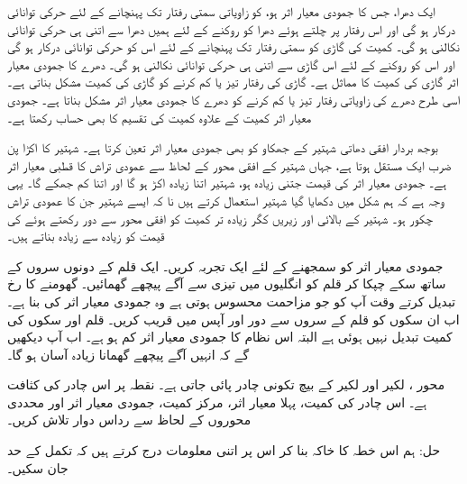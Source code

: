 ایک دھرا،  جس کا جمودی معیار اثر  ہو،  کو  زاویاتی سمتی رفتار  تک پہنچانے  کے لئے  حرکی  توانائی درکار ہو گی اور اس رفتار پر چلتے ہوئے دھرا کو روکنے کے لئے  ہمیں دھرا سے اتنی ہی  حرکی توانائی   نکالنی ہو گی۔ کمیت  کی گاڑی کو سمتی رفتار  تک پہنچانے کے لئے اس کو   حرکی توانائی درکار ہو گی اور اس کو روکنے کے لئے  اس  گاڑی سے اتنی ہی حرکی  توانائی نکالنی ہو گی۔ دھرے کا جمودی معیار اثر  گاڑی کی کمیت کا مماثل ہے۔ گاڑی کی رفتار تیز یا کم کرنے  کو   گاڑی  کی کمیت مشکل بناتی ہے۔اسی طرح دھرے کی زاویاتی رفتار تیز یا کم کرنے  کو  دھرے کا جمودی معیار اثر مشکل بناتا ہے۔ جمودی معیار اثر کمیت کے علاوہ کمیت کی تقسیم  کا بھی حساب رکھتا ہے۔

بوجھ بردار افقی  دھاتی شہتیر کے  جھکاو کو  بھی جمودی معیار اثر تعین کرتا ہے۔ شہتیر کا اکڑا پن   ضرب ایک مستقل ہوتا ہے، جہاں  شہتیر کے افقی محور  کے لحاظ سے عمودی تراش کا قطبی معیار اثر  ہے۔ جمودی معیار اثر  کی قیمت جتنی زیادہ ہو، شہتیر اتنا زیادہ  اکڑ ہو گا اور اتنا کم جھکے گا۔  یہی وجہ ہے کہ ہم شکل میں دکھایا گیا   شہتیر استعمال کرتے ہیں نا کہ ایسے شہتیر جن کا عمودی تراش  چکور ہو۔ شہتیر کے بالائی اور زیریں کگر زیادہ تر کمیت کو افقی محور سے دور رکھتے ہوئے  کی قیمت کو زیادہ سے زیادہ بناتے ہیں۔

 جمودی معیار اثر  کو سمجھنے کے لئے ایک تجربہ کریں۔ ایک قلم کے دونوں سروں کے ساتھ  سکے    چپکا   کر  قلم کو انگلیوں میں  تیزی سے آگے پیچھے گھمائیں۔  گھومنے کا رخ تبدیل کرتے وقت آپ کو جو مزاحمت محسوس ہوتی ہے وہ جمودی معیار اثر کی بنا ہے۔ اب ان سکوں کو  قلم کے  سروں سے دور اور آپس میں  قریب کریں۔ قلم اور سکوں کی کمیت تبدیل نہیں ہوئی ہے البتہ  اس نظام کا جمودی معیار اثر کم ہو ہے۔ اب   آپ دیکھیں گے کہ انہیں آگے پیچھے گھمانا زیادہ آسان ہو گا۔

محور ، لکیر  اور لکیر   کے بیچ تکونی چادر پائی جاتی ہے۔ نقطہ  پر اس چادر کی کثافت  ہے۔ اس چادر کی کمیت، پہلا معیار اثر، مرکز کمیت، جمودی معیار اثر اور محددی  محوروں کے لحاظ سے رداس دوار  تلاش کریں۔

حل:\quad
ہم اس خطہ کا خاکہ بنا کر اس پر اتنی معلومات درج کرتے ہیں کہ تکمل کے حد  جان سکیں۔

